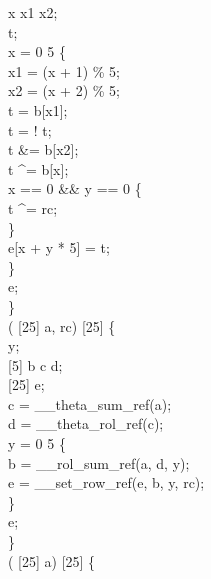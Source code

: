   x x1 x2;\\
  t;\\
 x = 0  5 \{\\
x1 = (x + 1) \% 5;\\
x2 = (x + 2) \% 5;\\
t = b[x1];\\
t = ! t;\\
t &= b[x2];\\
t \textasciicircum{}= b[x];\\
 x == 0 && y == 0 \{\\
t \textasciicircum{}= rc;\\
\}\\
e[x + y * 5] = t;\\
\}\\
 e;\\
\}\\
  ( [25] a,   rc) \jasminarrow{}  [25] \{\\
  y;\\
 [5] b c d;\\
 [25] e;\\
c = __theta_sum_ref(a);\\
d = __theta_rol_ref(c);\\
 y = 0  5 \{\\
b = __rol_sum_ref(a, d, y);\\
e = __set_row_ref(e, b, y, rc);\\
\}\\
 e;\\
\}\\
  ( [25] a) \jasminarrow{}  [25] \{\\
